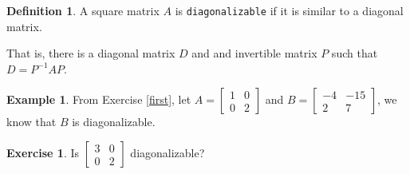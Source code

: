 \documentclass{beamer}
\newcommand{\fn}{\insertframenumber}
\theoremstyle{definition}
\newtheorem{exercise}{Exercise}
\newtheorem*{defn}{Definition}
\newtheorem*{exa}{Example}
\renewcommand{\emph}[1]{{\color{blue}\texttt{#1}}}
\begin{document}
\begin{frame}{\fn}
	\begin{defn}
		A square matrix $A$ is \emph{diagonalizable} if it is similar to a diagonal matrix.
		
		That is, there is a diagonal matrix $D$ and and invertible matrix $P$ such that $D=P^{-1}AP$.
	\end{defn}
	\begin{exa}
		From Exercise \ref{first}, let $A=\begin{bmatrix} 1&0\\0&2\end{bmatrix}$ and $B=\begin{bmatrix}-4&-15\\2&7\end{bmatrix}$, we know that $B$ is diagonalizable.
	\end{exa}
	\begin{exercise}
		Is $\begin{bmatrix}
		3&0\\0&2
		\end{bmatrix}$ diagonalizable?
	\end{exercise}
\end{frame}
\end{document}
